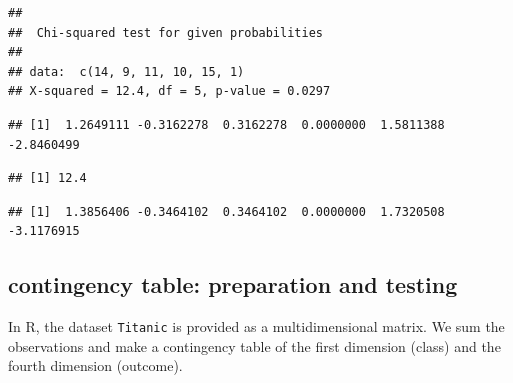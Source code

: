 \documentclass[
]{book}
\newenvironment{Shaded}{\begin{snugshade}}{\end{snugshade}}
\newcommand{\CommentTok}[1]{\textcolor[rgb]{0.56,0.35,0.01}{\textit{#1}}}
\newcommand{\DecValTok}[1]{\textcolor[rgb]{0.00,0.00,0.81}{#1}}
\newcommand{\FunctionTok}[1]{\textcolor[rgb]{0.13,0.29,0.53}{\textbf{#1}}}
\newcommand{\NormalTok}[1]{#1}
\newcommand{\SpecialCharTok}[1]{\textcolor[rgb]{0.81,0.36,0.00}{\textbf{#1}}}
\begin{document}
\begin{verbatim}
## 
##  Chi-squared test for given probabilities
## 
## data:  c(14, 9, 11, 10, 15, 1)
## X-squared = 12.4, df = 5, p-value = 0.0297
\end{verbatim}

\begin{Shaded}
\end{Shaded}

\begin{verbatim}
## [1]  1.2649111 -0.3162278  0.3162278  0.0000000  1.5811388 -2.8460499
\end{verbatim}

\begin{Shaded}
\end{Shaded}

\begin{verbatim}
## [1] 12.4
\end{verbatim}

\begin{Shaded}
\end{Shaded}

\begin{verbatim}
## [1]  1.3856406 -0.3464102  0.3464102  0.0000000  1.7320508 -3.1176915
\end{verbatim}

\hypertarget{contingency-table-preparation-and-testing}{%
\subsection{contingency table: preparation and testing}\label{contingency-table-preparation-and-testing}}

In R, the dataset \texttt{Titanic} is provided as a multidimensional matrix. We sum
the observations and make a contingency table of the first dimension (class) and
the fourth dimension (outcome).
\end{document}

